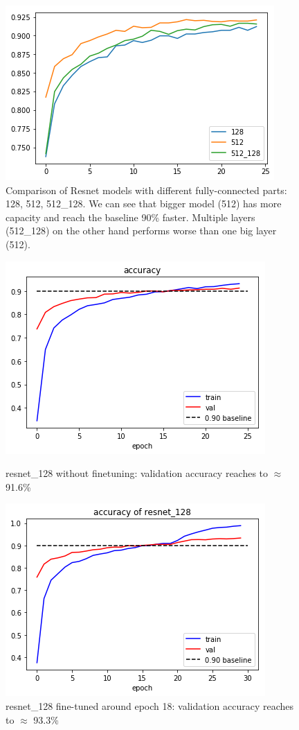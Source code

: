\begin{figure}[tb]
	\centering
	\includegraphics[width=0.6\hsize]{./figures/compareResnetNoFT}
	\caption{Comparison of Resnet models with different fully-connected parts: 128, 512, 512\_128. We can see that bigger model (512) has more capacity and reach the baseline 90\% faster. Multiple layers (512\_128) on the other hand performs worse than one big layer (512).}
	\label{fig:compareResnetNoFT}
\end{figure}

\begin{figure}[!ht]
	\centering
	\begin{minipage}[t]{0.45\linewidth}
		\includegraphics[scale=0.5]{./figures/accResnet128NoFT}
		\caption{resnet\_128 without finetuning: validation accuracy reaches to  $\approx$ 91.6\%}
		\label{fig:accResnet128NoFT}
	\end{minipage}
	\centering
	\begin{minipage}[t]{0.45\linewidth}
		\includegraphics[scale=0.5]{./figures/accResnet128}
		\caption{resnet\_128 fine-tuned around epoch 18: validation accuracy reaches to $\approx$ 93.3\%}
		\label{fig:accResnet128}
	\end{minipage}
\end{figure}


